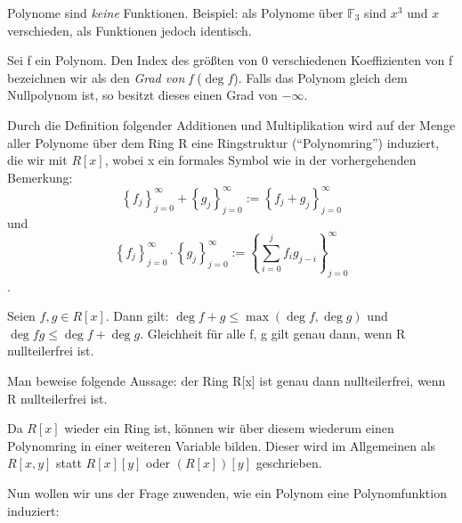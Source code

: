 \documentclass[10pt]{scrbook}
\begin{document}
\begin{Bem}
Polynome sind \emph{keine} Funktionen. Beispiel: als Polynome über $\mathbb{F}_3$ sind $x^3$ und $x$ verschieden, als Funktionen jedoch identisch.
\end{Bem}

\begin{Def}
Sei f ein Polynom. Den Index des größten von 0 verschiedenen Koeffizienten von f bezeichnen wir als den \emph{Grad von f} ($\deg f$). Falls das Polynom gleich dem Nullpolynom ist, so besitzt dieses einen Grad von $-\infty$.
\end{Def}

\begin{Def}
Durch die Definition folgender Additionen und Multiplikation wird auf der Menge aller Polynome über dem Ring R eine Ringstruktur ("`Polynomring"') induziert, die wir mit $R[x]$, wobei x ein formales Symbol wie in der vorhergehenden Bemerkung:
\begin{displaymath}
	\left\{f_j\right\}_{j=0}^\infty+\left\{g_j\right\}_{j=0}^\infty:=\left\{f_j+g_j\right\}_{j=0}^\infty
\end{displaymath}
und
\begin{displaymath}
	\left\{f_j\right\}_{j=0}^\infty\cdot\left\{g_j\right\}_{j=0}^\infty:=\left\{\sum\limits_{i=0}^j{f_i g_{j-i}}\right\}_{j=0}^\infty
\end{displaymath}.
\end{Def}

\begin{Le}
Seien $f, g\in R[x]$. Dann gilt: $\deg f+g\leq \max(\deg f, \deg g)$ und $\deg f g\leq \deg f+\deg g$. Gleichheit für alle f, g gilt genau dann, wenn R nullteilerfrei ist.
\end{Le}

\begin{Auf}
Man beweise folgende Aussage: der Ring R[x] ist genau dann nullteilerfrei, wenn R nullteilerfrei ist.
\end{Auf}

\begin{Bem}
Da $R[x]$ wieder ein Ring ist, können wir über diesem wiederum einen Polynomring in einer weiteren Variable bilden. Dieser wird im Allgemeinen als $R[x, y]$ statt $R[x][y]$ oder $(R[x])[y]$ geschrieben.
\end{Bem}

Nun wollen wir uns der Frage zuwenden, wie ein Polynom eine Polynomfunktion induziert: 
\end{document}
